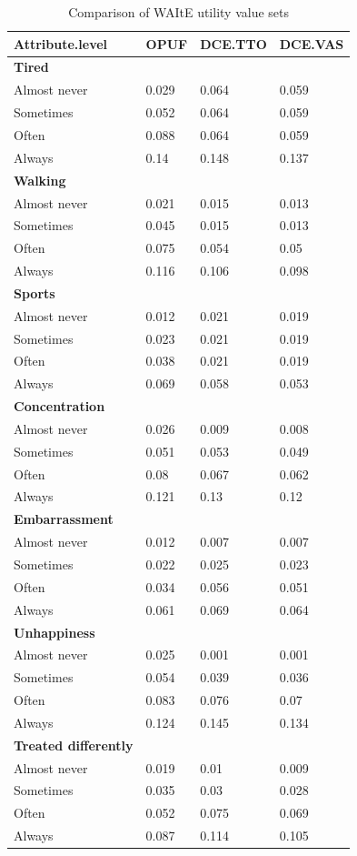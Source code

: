 \documentclass[
  number,
  preprint]{elsarticle}
\begin{document}
\begin{longtable}[]{@{}llll@{}}

\caption{\label{tbl-WAItEvalsets}Comparison of WAItE utility value sets}

\tabularnewline

\toprule\noalign{}
Attribute.level & OPUF & DCE.TTO & DCE.VAS \\
\midrule\noalign{}
\endhead
\bottomrule\noalign{}
\endlastfoot
\textbf{Tired} & \textbf{} & \textbf{} & \textbf{} \\
Almost never & 0.029 & 0.064 & 0.059 \\
Sometimes & 0.052 & 0.064 & 0.059 \\
Often & 0.088 & 0.064 & 0.059 \\
Always & 0.14 & 0.148 & 0.137 \\
\textbf{Walking} & \textbf{} & \textbf{} & \textbf{} \\
Almost never & 0.021 & 0.015 & 0.013 \\
Sometimes & 0.045 & 0.015 & 0.013 \\
Often & 0.075 & 0.054 & 0.05 \\
Always & 0.116 & 0.106 & 0.098 \\
\textbf{Sports} & \textbf{} & \textbf{} & \textbf{} \\
Almost never & 0.012 & 0.021 & 0.019 \\
Sometimes & 0.023 & 0.021 & 0.019 \\
Often & 0.038 & 0.021 & 0.019 \\
Always & 0.069 & 0.058 & 0.053 \\
\textbf{Concentration} & \textbf{} & \textbf{} & \textbf{} \\
Almost never & 0.026 & 0.009 & 0.008 \\
Sometimes & 0.051 & 0.053 & 0.049 \\
Often & 0.08 & 0.067 & 0.062 \\
Always & 0.121 & 0.13 & 0.12 \\
\textbf{Embarrassment} & \textbf{} & \textbf{} & \textbf{} \\
Almost never & 0.012 & 0.007 & 0.007 \\
Sometimes & 0.022 & 0.025 & 0.023 \\
Often & 0.034 & 0.056 & 0.051 \\
Always & 0.061 & 0.069 & 0.064 \\
\textbf{Unhappiness} & \textbf{} & \textbf{} & \textbf{} \\
Almost never & 0.025 & 0.001 & 0.001 \\
Sometimes & 0.054 & 0.039 & 0.036 \\
Often & 0.083 & 0.076 & 0.07 \\
Always & 0.124 & 0.145 & 0.134 \\
\textbf{Treated differently} & \textbf{} & \textbf{} & \textbf{} \\
Almost never & 0.019 & 0.01 & 0.009 \\
Sometimes & 0.035 & 0.03 & 0.028 \\
Often & 0.052 & 0.075 & 0.069 \\
Always & 0.087 & 0.114 & 0.105 \\


\end{longtable}
\end{document}

